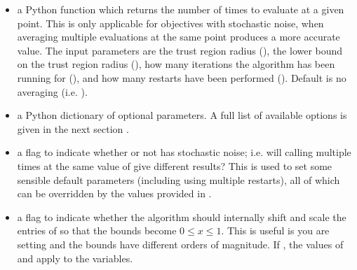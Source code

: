\documentclass[letterpaper,10pt,english]{sphinxmanual}
\begin{document}
\begin{itemize}
\item {} 
\sphinxAtStartPar
{} \sphinxhyphen{} a Python function  which returns the number of times to evaluate  at a given point. This is only applicable for objectives with stochastic noise, when averaging multiple evaluations at the same point produces a more accurate value. The input parameters are the trust region radius (), the lower bound on the trust region radius (), how many iterations the algorithm has been running for (), and how many restarts have been performed (). Default is no averaging (i.e. ).

\item {} 
\sphinxAtStartPar
{} \sphinxhyphen{} a Python dictionary  of optional parameters. A full list of available options is given in the next section {\hyperref[\detokenize{advanced::doc}]{}}.

\item {} 
\sphinxAtStartPar
{} \sphinxhyphen{} a flag to indicate whether or not  has stochastic noise; i.e. will calling  multiple times at the same value of  give different results? This is used to set some sensible default parameters (including using multiple restarts), all of which can be overridden by the values provided in .

\item {} 
\sphinxAtStartPar
{} \sphinxhyphen{} a flag to indicate whether the algorithm should internally shift and scale the entries of  so that the bounds become \(0 \leq x \leq 1\). This is useful is you are setting  and the bounds have different orders of magnitude. If , the values of  and  apply to the  variables.


\end{itemize}
\end{document}
